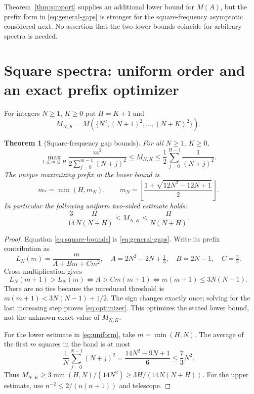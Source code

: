 \documentclass[11pt]{article}
\newtheorem{theorem}{Theorem}[section]
\theoremstyle{remark}\newtheorem{remark}[theorem]{Remark}
\begin{document}
Theorem~\ref{thm:support} supplies an additional lower bound for $M(A)$,
but the prefix form in \eqref{eq:general-gaps} is stronger for the square-frequency
asymptotic considered next. No assertion that the two lower bounds coincide for
arbitrary spectra is needed.

\section{Square spectra: uniform order and an exact prefix optimizer}

For integers $N\ge1$, $K\ge0$ put $H=K+1$ and
\[
 M_{N,K}=M(\{N^2,(N+1)^2,\ldots,(N+K)^2\}).
\]

\begin{theorem}[Square-frequency gap bounds]\label{thm:squares}
For all $N\ge1$, $K\ge0$,
\begin{equation}\label{eq:square-bounds}
 \max_{1\le m\le H}\frac{m^2}{2\sum_{j=0}^{m-1}(N+j)^2}
 \le M_{N,K}\le\frac12\sum_{j=0}^{H-1}\frac1{(N+j)^2}.
\end{equation}
The unique maximizing prefix in the lower bound is
\begin{equation}\label{eq:optimizer}
 m_* =\min(H,m_N),\qquad
 m_N=\left\lfloor\frac{1+\sqrt{12N^2-12N+1}}2\right\rfloor.
\end{equation}
In particular the following uniform two-sided estimate holds:
\begin{equation}\label{eq:uniform}
 \boxed{\displaystyle
 \frac3{14}\frac{H}{N(N+H)}\le M_{N,K}\le\frac{H}{N(N+H)}.}
\end{equation}
\end{theorem}

\begin{proof}
Equation \eqref{eq:square-bounds} is \eqref{eq:general-gaps}.
Write its prefix contribution as
\[
 L_N(m)=\frac{m}{A+Bm+Cm^2},\quad
 A=2N^2-2N+\tfrac13,\quad B=2N-1,\quad C=\tfrac23.
\]
Cross multiplication gives
\[
 L_N(m+1)>L_N(m)
 \iff A>Cm(m+1)
 \iff m(m+1)\le3N(N-1).
\]
There are no ties because the unreduced threshold is
$m(m+1)<3N(N-1)+1/2$. The sign changes exactly once; solving for the last
increasing step proves \eqref{eq:optimizer}. This optimizes the stated lower
bound, not the unknown exact value of $M_{N,K}$.

For the lower estimate in \eqref{eq:uniform}, take $m=\min(H,N)$. The average
of the first $m$ squares in the band is at most
\[
 \frac1N\sum_{j=0}^{N-1}(N+j)^2
 =\frac{14N^2-9N+1}{6}\le\frac73N^2.
\]
Thus $M_{N,K}\ge3\min(H,N)/(14N^2)\ge3H/(14N(N+H))$.
For the upper estimate, use
$n^{-2}\le2/(n(n+1))$ and telescope.
\end{proof}
\end{document}

